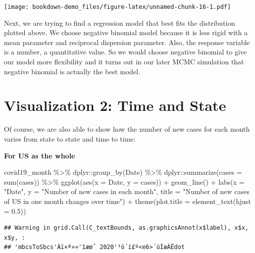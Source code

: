 \documentclass[
]{book}
\newenvironment{Shaded}{\begin{snugshade}}{\end{snugshade}}
\newcommand{\AttributeTok}[1]{\textcolor[rgb]{0.77,0.63,0.00}{#1}}
\newcommand{\FloatTok}[1]{\textcolor[rgb]{0.00,0.00,0.81}{#1}}
\newcommand{\FunctionTok}[1]{\textcolor[rgb]{0.00,0.00,0.00}{#1}}
\newcommand{\NormalTok}[1]{#1}
\newcommand{\SpecialCharTok}[1]{\textcolor[rgb]{0.00,0.00,0.00}{#1}}
\newcommand{\StringTok}[1]{\textcolor[rgb]{0.31,0.60,0.02}{#1}}
\begin{document}
\texttt{[image: bookdown-demo\_files/figure-latex/unnamed-chunk-16-1.pdf]}

Next, we are trying to find a regression model that best fits the distribution plotted above. We choose negative binomial model because it is less rigid with a mean parameter and reciprocal dispersion parameter. Also, the response variable is a number, a quantitative value. So we would choose negative binomial to give our model more flexibility and it turns out in our later MCMC simulation that negative binomial is actually the best model.

\hypertarget{visualization-2-time-and-state}{%
\section{Visualization 2: Time and State}\label{visualization-2-time-and-state}}

Of course, we are also able to show how the number of new cases for each month varies from state to state and time to time:

\textbf{For US as the whole}

\begin{Shaded}
\begin{Highlighting}[]
\NormalTok{covid19\_month }\SpecialCharTok{\%\textgreater{}\%} 
\NormalTok{  dplyr}\SpecialCharTok{::}\FunctionTok{group\_by}\NormalTok{(Date) }\SpecialCharTok{\%\textgreater{}\%}
\NormalTok{  dplyr}\SpecialCharTok{::}\FunctionTok{summarize}\NormalTok{(}\AttributeTok{cases =} \FunctionTok{sum}\NormalTok{(cases)) }\SpecialCharTok{\%\textgreater{}\%}
  \FunctionTok{ggplot}\NormalTok{(}\FunctionTok{aes}\NormalTok{(}\AttributeTok{x =}\NormalTok{ Date, }\AttributeTok{y =}\NormalTok{ cases)) }\SpecialCharTok{+}
  \FunctionTok{geom\_line}\NormalTok{() }\SpecialCharTok{+} 
  \FunctionTok{labs}\NormalTok{(}\AttributeTok{x =} \StringTok{"Date"}\NormalTok{, }\AttributeTok{y =} \StringTok{"Number of new cases in each month"}\NormalTok{, }\AttributeTok{title =} \StringTok{"Number of new cases of US in one month changes over time"}\NormalTok{) }\SpecialCharTok{+}
  \FunctionTok{theme}\NormalTok{(}\AttributeTok{plot.title =} \FunctionTok{element\_text}\NormalTok{(}\AttributeTok{hjust =} \FloatTok{0.5}\NormalTok{))}
\end{Highlighting}
\end{Shaded}

\begin{verbatim}
## Warning in grid.Call(C_textBounds, as.graphicsAnnot(x$label), x$x, x$y, :
## 'mbcsToSbcs'Àï×ª»»'1æœˆ 2020'³ö´í£º<e6>´úÌæÁËdot
\end{verbatim}
\end{document}
